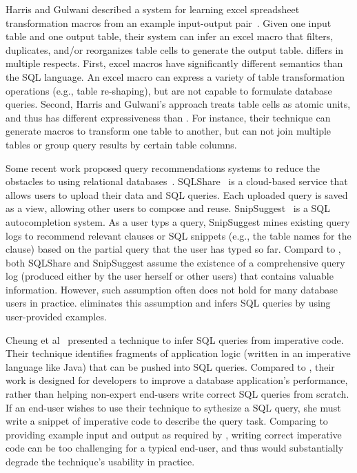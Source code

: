 Harris and Gulwani described a system for learning excel
spreadsheet transformation macros from an example
input-output pair~\cite{Harris:2011}. Given one input table and one output
table, their system can infer an excel macro that filters,
duplicates, and/or reorganizes table cells to generate the output table.
\ourtool differs in multiple respects.
First, excel macros have significantly different
semantics than the SQL language.
An excel macro can express a variety of table transformation operations
(e.g., table re-shaping), but are not capable to formulate database queries.
Second, Harris and Gulwani's approach treats table cells
as atomic units, and thus has different expressiveness
than \ourtool. For instance, their technique can generate macros to
transform one table to another, but can not join multiple
tables or group query results by certain table columns. 




Some recent work proposed query recommendations systems to reduce
the obstacles to using relational databases~\cite{Howe:2011, Khoussainova:2010}. 
SQLShare~\cite{Howe:2011} is a cloud-based service that allows
users to upload their data and SQL queries. 
Each uploaded query is saved as a view, allowing other users
to compose and reuse. SnipSuggest~\cite{Khoussainova:2010} is a SQL autocompletion
system. As a user typs a query, SnipSuggest mines existing query
logs to recommend relevant clauses or SQL snippets (e.g., the table
names for the  clause) based on the partial query that
the user has typed so far.
Compard to \ourtool, both SQLShare and SnipSuggest assume the
existence of a comprehensive query log (produced either
by the user herself or other users)
that contains valuable information.
However, such assumption often does not hold for
many database users in practice.
\ourtool eliminates this assumption and infers 
SQL queries by using user-provided examples.


Cheung et al~\cite{abs-1208-2013} presented a technique to infer SQL
queries from imperative code. Their technique identifies
fragments of application logic (written in an imperative language
like Java) that can be pushed into SQL queries. 
Compared to \ourtool, their work is designed for developers
to improve a database application's performance,
rather than helping non-expert end-users
write correct SQL queries from scratch. 
If an end-user wishes to use their technique to 
sythesize a SQL query, she must write a snippet of
imperative code to describe the query task.
Comparing to providing example input
and output as required by \ourtool,
writing correct imperative code can be too challenging
for a typical end-user, and thus would
substantially degrade the technique's usability in practice.


